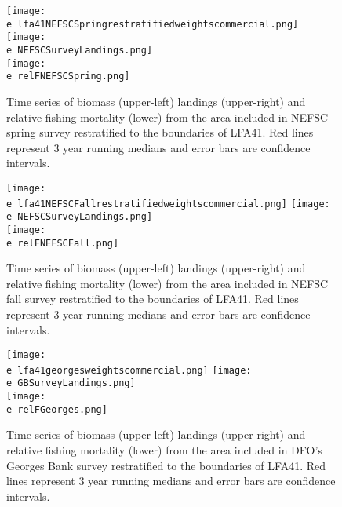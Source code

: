 \documentclass[11pt]{article}
\newcommand{\e}{/backup/bio_data/bio.lobster/figures/} %
\begin{document}
\begin{figure}

    \texttt{[image: \\e lfa41NEFSCSpringrestratifiedweightscommercial.png]}
    \texttt{[image: \\e NEFSCSurveyLandings.png]} \\
    \texttt{[image: \\e relFNEFSCSpring.png]} \\
    \caption{Time series of biomass (upper-left) landings (upper-right) and relative fishing mortality (lower) from the area included in NEFSC spring survey restratified to the boundaries of LFA41. Red lines represent 3 year running medians and error bars are confidence intervals.}

\end{figure}


\begin{figure}

    \texttt{[image: \\e lfa41NEFSCFallrestratifiedweightscommercial.png]}
    \texttt{[image: \\e NEFSCSurveyLandings.png]} \\
    \texttt{[image: \\e relFNEFSCFall.png]} \\
    \caption{Time series of biomass (upper-left) landings (upper-right) and relative fishing mortality (lower) from the area included in NEFSC fall survey restratified to the boundaries of LFA41. Red lines represent 3 year running medians and error bars are confidence intervals.}

\end{figure}


\begin{figure}

    \texttt{[image: \\e lfa41georgesweightscommercial.png]}
    \texttt{[image: \\e GBSurveyLandings.png]} \\
    \texttt{[image: \\e relFGeorges.png]} \\
    \caption{Time series of biomass (upper-left) landings (upper-right) and relative fishing mortality (lower) from the area included in DFO's Georges Bank survey restratified to the boundaries of LFA41. Red lines represent 3 year running medians and error bars are confidence intervals.}

\end{figure}
\end{document}

